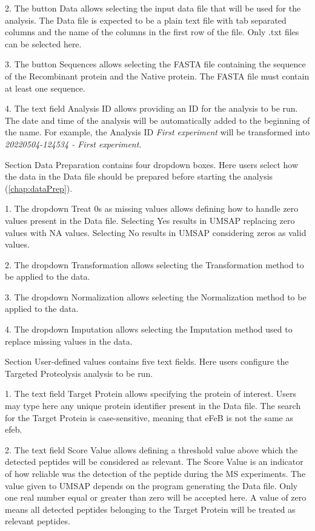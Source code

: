\num{2}. The button Data allows selecting the input
data file that will be used for the analysis. The Data file is expected to be a
plain text file with tab separated columns and the name of the columns in the first
row of the file. Only .txt files can be selected here.

\num{3}. The button Sequences allows selecting the
FASTA file containing the sequence of the Recombinant protein and the Native protein.
The FASTA file must contain at least one sequence.

\num{4}. The text field Analysis ID allows providing an ID for the analysis
to be run. The date and time of the analysis will be automatically added to the
beginning of the name. For example, the Analysis ID \textit{First experiment} will
be transformed into \textit{20220504-124534 - First experiment}.

Section Data Preparation contains four dropdown boxes. Here users select how the data
in the Data file should be prepared before starting the analysis (\autoref{chap:dataPrep}).

\num{1}. The dropdown Treat \num{0}s as missing values allows defining how
to handle zero values present in the Data file. Selecting Yes results in UMSAP
replacing zero values with NA values. Selecting No results in UMSAP considering
zeros as valid values.

\num{2}. The dropdown Transformation allows selecting the Transformation method
to be applied to the data.

\num{3}. The dropdown Normalization allows selecting the Normalization method
to be applied to the data.

\num{4}. The dropdown Imputation allows selecting the Imputation method used
to replace missing values in the data.

Section User-defined values contains five text fields. Here users configure the 
Targeted Proteolysis analysis to be run.

\num{1}. The text field Target Protein\label{par:tarportTargetProtein} allows
specifying the protein of interest. Users may type here any unique protein identifier
present in the Data file. The search for the Target Protein is case-sensitive, meaning
that eFeB is not the same as efeb.

\num{2}. The text field Score Value\label{par:tarprotScoreValue} allows
defining a threshold value above which the detected peptides will be considered as
relevant. The Score Value is an indicator of how reliable was the detection of the peptide
during the MS experiments. The value given to UMSAP depends on the program generating
the Data file. Only one real number equal or greater than zero will be accepted here.
A value of zero means all detected peptides belonging to the Target Protein will
be treated as relevant peptides.

